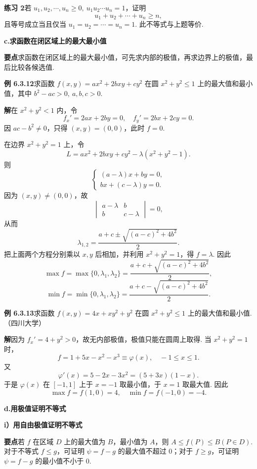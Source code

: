 \documentclass[UTF8, 12pt, fontset=fandol, oneside]{ctexart}
\begin{document}
\noindent\textbf{练习 2}\quad 若 $u_1,u_2,\cdots,u_n\ge0,\ u_1u_2\cdots u_n=1$，证明
\[
  u_1+u_2+\cdots+u_n\ge n,
\]
且等号成立当且仅当 $u_1=u_2=\cdots=u_n=1$. 此不等式与上题等价.

\noindent\textbf{c.\quad 求函数在闭区域上的最大最小值}

\noindent\textbf{要点}\quad 求函数在闭区域上的最大最小值，可先求内部的极值，再求边界上的极值，最后比较各候选值.

\noindent\textbf{例 6.3.12}\quad 求函数 $f(x,y)=ax^2+2bxy+cy^2$ 在圆 $x^2+y^2\le1$ 上的最大值和最小值，其中 $b^2-ac>0,\ a,b,c>0$.

\noindent\textbf{解}\quad 在 $x^2+y^2<1$ 内，令
\[
  f_x'=2ax+2by=0,\quad f_y'=2bx+2cy=0.
\]
因 $ac-b^2\ne0$，只得 $(x,y)=(0,0)$，此时 $f=0$.

在边界 $x^2+y^2=1$ 上，令
\[
  L=ax^2+2bxy+cy^2-\lambda(x^2+y^2-1).
\]
则
\[
  \begin{cases}
    (a-\lambda)x+by=0,\\
    bx+(c-\lambda)y=0.
  \end{cases}
\]
因为 $(x,y)\ne(0,0)$，故
\[
  \begin{vmatrix}
    a-\lambda&b\\
    b&c-\lambda
  \end{vmatrix}=0,
\]
从而
\[
  \lambda_{1,2}=\frac{a+c\pm\sqrt{(a-c)^2+4b^2}}{2}.
\]
把上面两个方程分别乘以 $x,y$ 后相加，并利用 $x^2+y^2=1$，得 $f=\lambda$. 因此
\[
  \max f=\max\{0,\lambda_1,\lambda_2\}
  =\frac{a+c+\sqrt{(a-c)^2+4b^2}}{2},
\]
\[
  \min f=\min\{0,\lambda_1,\lambda_2\}
  =\frac{a+c-\sqrt{(a-c)^2+4b^2}}{2}.
\]

\noindent\textbf{例 6.3.13}\quad 求函数 $f(x,y)=4x+xy^2+y^2$ 在圆 $x^2+y^2\le1$ 上的最大值和最小值.（四川大学）

\noindent\textbf{解}\quad 因为 $f_x'=4+y^2>0$，故无内部极值，极值只能在圆周上取得. 当 $x^2+y^2=1$ 时，
\[
  f=1+5x-x^2-x^3\equiv\varphi(x),\quad -1\le x\le1.
\]
又
\[
  \varphi'(x)=5-2x-3x^2=(5+3x)(1-x).
\]
于是 $\varphi(x)$ 在 $[-1,1]$ 上于 $x=-1$ 取最小值，于 $x=1$ 取最大值. 因此
\[
  \max f=f(1,0)=4,\quad \min f=f(-1,0)=-4.
\]

\noindent\textbf{d.\quad 用极值证明不等式}

\noindent\textbf{i）用自由极值证明不等式}

\noindent\textbf{要点}\quad 若 $f$ 在区域 $D$ 上的最大值为 $B$，最小值为 $A$，则 $A\le f(P)\le B(P\in D)$. 对于不等式 $f\le g$，可证明 $\psi=f-g$ 的最大值不超过 $0$；对于 $f\ge g$，可证明 $\psi=f-g$ 的最小值不小于 $0$.
\end{document}

